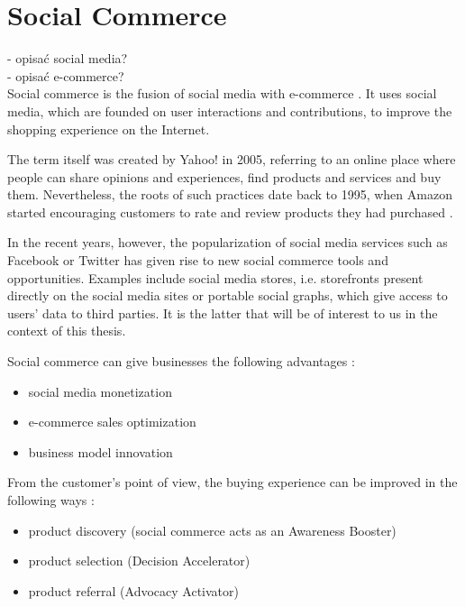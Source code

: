 \documentclass[12pt]{report}
\begin{document}
\section{Social Commerce}

- opisać social media?\\
- opisać e-commerce?\\

Social commerce is the fusion of social media with e-commerce \cite{social_commerce_syzygy}. It uses social media, which are founded on user interactions and contributions, to improve the shopping experience on the Internet.

The term itself was created by Yahoo! in 2005, referring to an online place where people can share opinions and experiences, find products and services and buy them. Nevertheless, the roots of such practices date back to 1995, when Amazon started encouraging customers to rate and review products they had purchased \cite{social_commerce_syzygy}.

In the recent years, however, the popularization of social media services such as Facebook or Twitter has given rise to new social commerce tools and opportunities. Examples include social media stores, i.e. storefronts present directly on the social media sites or portable social graphs, which give access to users' data to third parties. It is the latter that will be of interest to us in the context of this thesis.


Social commerce can give businesses the following advantages \cite{social_commerce_syzygy}:
\begin{itemize}
\item social media monetization
\item e-commerce sales optimization
\item business model innovation
\end{itemize}

From the customer's point of view, the buying experience can be improved in the following ways \cite{social_commerce_syzygy}:
\begin{itemize}
\item product discovery (social commerce acts as an Awareness Booster)
\item product selection (Decision Accelerator)
\item product referral (Advocacy Activator)
\end{itemize}
\end{document}
